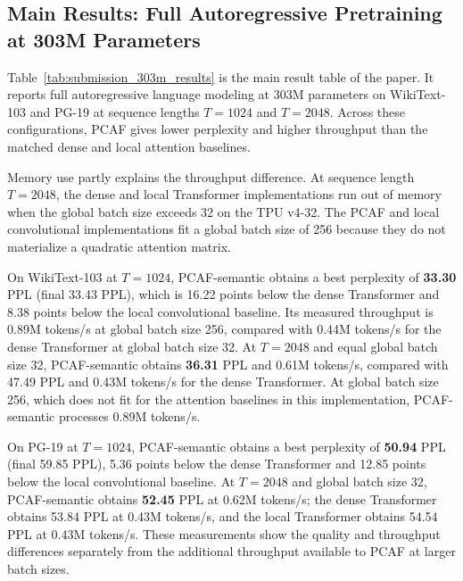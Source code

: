 \documentclass[11pt]{article}
\begin{document}
\subsection{Main Results: Full Autoregressive Pretraining at 303M Parameters}
\label{sec:full-ar-303m}

Table~\ref{tab:submission_303m_results} is the main result table of the paper.
It reports full autoregressive language modeling at 303M parameters on
WikiText-103 and PG-19 at sequence lengths $T = 1024$ and $T = 2048$.
Across these configurations, PCAF gives lower perplexity and higher throughput
than the matched dense and local attention baselines.

Memory use partly explains the throughput difference. At sequence length
$T = 2048$, the dense and local Transformer implementations run out of memory
when the global batch size exceeds 32 on the TPU v4-32. The PCAF and local
convolutional implementations fit a global batch size of 256 because they do
not materialize a quadratic attention matrix.

On WikiText-103 at $T = 1024$, PCAF-semantic obtains a best perplexity of
\textbf{33.30} PPL (final 33.43 PPL), which is 16.22 points below the dense
Transformer and 8.38 points below the local convolutional baseline. Its measured
throughput is 0.89M tokens/s at global batch size 256, compared with 0.44M
tokens/s for the dense Transformer at global batch size 32. At $T = 2048$ and
equal global batch size 32, PCAF-semantic obtains \textbf{36.31} PPL and 0.61M
tokens/s, compared with 47.49 PPL and 0.43M tokens/s for the dense Transformer.
At global batch size 256, which does not fit for the attention baselines in this
implementation, PCAF-semantic processes 0.89M tokens/s.

On PG-19 at $T = 1024$, PCAF-semantic obtains a best perplexity of
\textbf{50.94} PPL (final 59.85 PPL), 5.36 points below the dense Transformer
and 12.85 points below the local convolutional baseline. At $T = 2048$ and
global batch size 32, PCAF-semantic obtains \textbf{52.45} PPL at 0.62M
tokens/s; the dense Transformer obtains 53.84 PPL at 0.43M tokens/s, and the
local Transformer obtains 54.54 PPL at 0.43M tokens/s. These measurements show
the quality and throughput differences separately from the additional
throughput available to PCAF at larger batch sizes.
\end{document}
